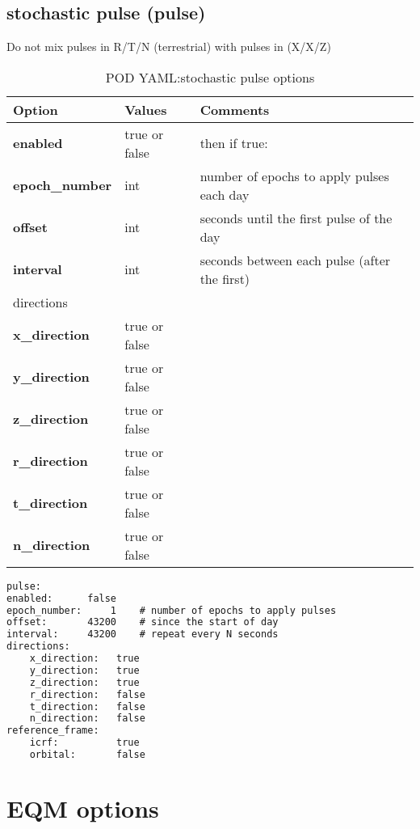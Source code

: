 \subsection{stochastic pulse (pulse)}
%
Do not mix pulses in R/T/N (terrestrial) with pulses in (X/X/Z)
%
\begin{table}[h!]
	\begin{tabular}{|p{4.5cm}|p{2cm}|p{3.5cm}|}
		\hline
		Option & Values & Comments \\
		\hline
		\textbf{enabled} & true or false & then if true: \\
		\hline
		\textbf{epoch\_number} & int & number of epochs to apply pulses each day \\
		\textbf{offset} & int & seconds until the first pulse of the day \\
		\textbf{interval} & int & seconds between each pulse (after the first)\\
		\hline
		directions & & \\
		\textbf{x\_direction} &  true or false &  \\
		\textbf{y\_direction} &  true or false &  \\
		\textbf{z\_direction} &  true or false &  \\
		\textbf{r\_direction} &  true or false &  \\
		\textbf{t\_direction} &  true or false &  \\
		\textbf{n\_direction} &  true or false &  \\
\hline
	\end{tabular}
	\caption{POD YAML:stochastic pulse options}
	\label{table:pod_yaml_stochastic_pulse}
\end{table}
%
\begin{lstlisting}[language=xml,caption=yaml example for gravitational force model options]
pulse:
enabled:      false
epoch_number:     1    # number of epochs to apply pulses
offset:       43200    # since the start of day
interval:     43200    # repeat every N seconds
directions:
	x_direction:   true
	y_direction:   true
	z_direction:   true
	r_direction:   false
	t_direction:   false
	n_direction:   false
reference_frame:
	icrf:          true
	orbital:       false
\end{lstlisting}
%
\section{EQM options}
%
